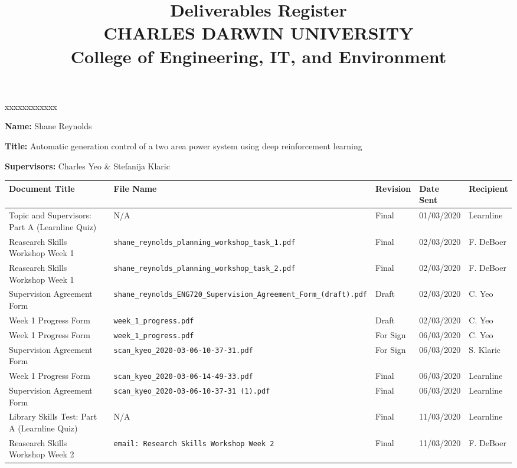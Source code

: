 \documentclass[10pt, landscape]{article}
\title{	
		Deliverables Register\\
		CHARLES DARWIN UNIVERSITY\\
		College of Engineering, IT, and Environment
	  }
\author{}
\date{}
\begin{document}
	
	\maketitle
	
	\begin{namelist}{xxxxxxxxxxxx}
		\item[{\bf Name:}]
			Shane Reynolds
		\item[{\bf Title:}]
			Automatic generation control of a two area power system using deep reinforcement learning
		\item[{\bf Supervisors:}]
			Charles Yeo \& Stefanija Klaric
	\end{namelist}
	
	\small
	\begin{tabular}{p{7cm}p{10cm}p{1.5cm}p{2cm}p{2cm}}
	\toprule
	\textbf{Document Title}							& \textbf{File Name}				& \textbf{Revision} & \textbf{Date Sent} 	& \textbf{Recipient} \\
	\midrule
	Topic and Supervisors: Part A (Learnline Quiz)	& N/A								& Final 			& 01/03/2020		 	& Learnline\\
	Reasearch Skills Workshop Week 1				& \verb|shane_reynolds_planning_workshop_task_1.pdf|						& Final				& 02/03/2020		 	& F. DeBoer\\
	Reasearch Skills Workshop Week 1				& \verb|shane_reynolds_planning_workshop_task_2.pdf|						& Final				& 02/03/2020			& F. DeBoer\\
	Supervision Agreement Form						& \verb|shane_reynolds_ENG720_Supervision_Agreement_Form_(draft).pdf|						& Draft				& 02/03/2020			& C. Yeo\\
	Week 1 Progress Form						& \verb|week_1_progress.pdf|						& Draft				& 02/03/2020			& C. Yeo\\
	Week 1 Progress Form							& \verb|week_1_progress.pdf|									& 				For Sign			& 06/03/2020			& C. Yeo\\
	Supervision Agreement Form						& \verb|scan_kyeo_2020-03-06-10-37-31.pdf|						& 				For Sign			& 06/03/2020			& S. Klaric\\
	Week 1 Progress Form							& \verb|scan_kyeo_2020-03-06-14-49-33.pdf|						& 				Final				& 06/03/2020			& Learnline\\
	Supervision Agreement Form						& \verb|scan_kyeo_2020-03-06-10-37-31 (1).pdf|					& 				Final				& 06/03/2020			& Learnline\\
	Library Skills Test: Part A (Learnline Quiz)	& N/A															& 				Final 				& 11/03/2020		 	& Learnline\\
	Reasearch Skills Workshop Week 2				& \verb|email: Research Skills Workshop Week 2|					& 				Final				& 11/03/2020		 	& F. DeBoer\\
	\bottomrule
	\end{tabular}
\end{document}
